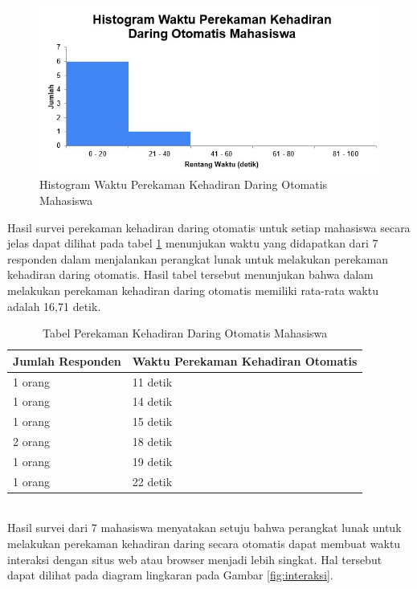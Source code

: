 \begin{figure}[H]
		\centering
		\includegraphics[scale=0.75]{Gambar/HistogramDaringOtomatisMahasiswa.jpg}
		\caption{Histogram Waktu Perekaman Kehadiran Daring Otomatis Mahasiswa}
		\label{fig:olMahasiswa}
	\end{figure}
Hasil survei perekaman kehadiran daring otomatis untuk setiap mahasiswa secara jelas dapat dilihat pada tabel \ref{tab:otomatis} menunjukan waktu yang didapatkan dari 7 responden dalam menjalankan perangkat lunak untuk melakukan perekaman kehadiran daring otomatis. Hasil tabel tersebut menunjukan bahwa dalam melakukan perekaman kehadiran daring otomatis memiliki rata-rata waktu adalah 16,71 detik.
	\begin{table}[ht]			
		\caption{Tabel Perekaman Kehadiran Daring Otomatis Mahasiswa}
		\centering
		\begin{tabular}{|p{3.5cm} |p{7cm}|}
			\hline
			Jumlah Responden &  Waktu Perekaman Kehadiran Otomatis \\ \hline     
			1 orang &  11 detik\\ \hline 
			1 orang &  14 detik\\ \hline 
			1 orang &  15 detik\\ \hline 
			2 orang &  18 detik\\ \hline 
			1 orang &  19 detik\\ \hline 
			1 orang &  22 detik\\ \hline 
		\end{tabular}
		\label{tab:otomatis}
	\end{table}
\\
Hasil survei dari 7 mahasiswa menyatakan setuju bahwa perangkat lunak untuk melakukan perekaman kehadiran daring secara otomatis dapat membuat waktu interaksi dengan situs web atau browser menjadi lebih singkat. Hal tersebut dapat dilihat pada diagram lingkaran pada Gambar \ref{fig:interaksi}.
